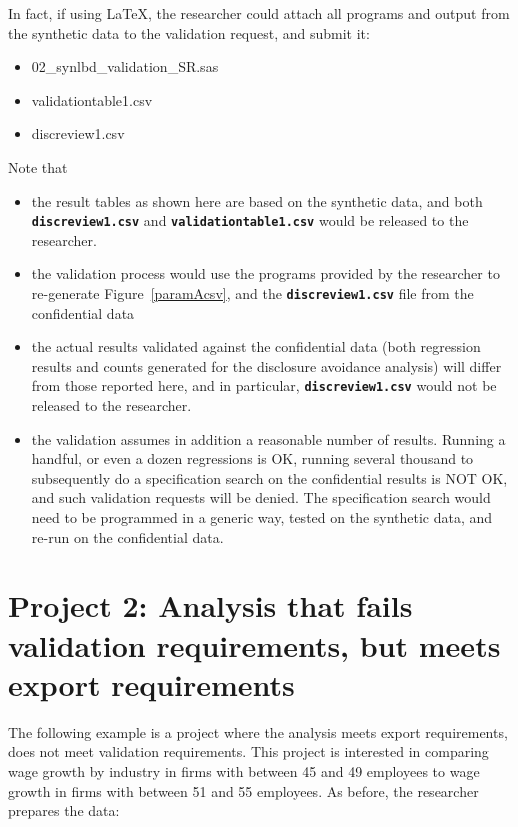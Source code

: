 \documentclass{article}
\newcommand*{\Code}[1]{\texttt{\textbf{#1}}}
\begin{document}
In fact, if using \LaTeX, the researcher could attach all programs and output from the synthetic data to the validation request, and submit it:

\begin{itemize}
\item 02\_synlbd\_validation\_SR.sas 
\item validationtable1.csv 
\item discreview1.csv 
\end{itemize}

Note that 
\begin{itemize}
\item the result tables as shown here are based on the synthetic data, and both \Code{discreview1.csv} and \Code{validationtable1.csv} would be released to the researcher. 
\item the validation process would use the programs provided by the researcher to re-generate  Figure~\ref{paramAcsv}, and the  \Code{discreview1.csv} file from the confidential data
\item the actual results validated against the confidential data (both regression results and counts generated for the disclosure avoidance analysis) will differ from those reported here, and in particular,  \Code{discreview1.csv} would not be released to the researcher.
\item the validation assumes in addition a reasonable number of results. Running a handful, or even a dozen regressions is OK, running several thousand to subsequently do a specification search on the confidential results is NOT OK, and such validation requests will be denied. The specification search would need to be programmed in a generic way, tested on the synthetic data, and re-run on the confidential data. 
\end{itemize}

\newpage
\section{Project 2:  Analysis that fails validation requirements, but meets export requirements}
\label{sec:2}
The following example is a project where the analysis meets export requirements, does not meet validation requirements. This project is interested in comparing wage growth by industry in firms with between 45 and 49 employees to wage growth in firms with between 51 and 55  employees. As before,  the researcher prepares the data:
\end{document}
